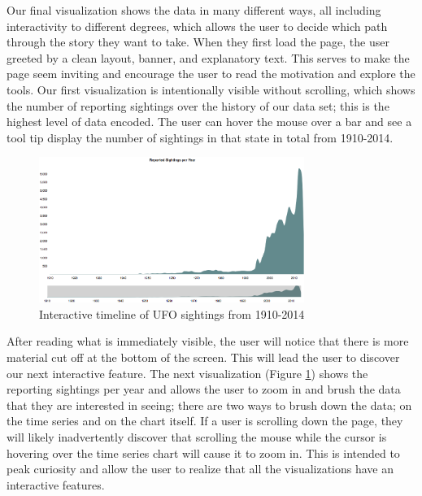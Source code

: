 \documentclass[journal]{vgtc}                %
\begin{document}
%
%
%


Our final visualization shows the data in many different ways, all including interactivity to different degrees, which allows the user to decide which path through the story they want to take. When they first load the page, the user greeted by a clean layout, banner, and explanatory text. This serves to make the page seem inviting and encourage the user to read the motivation and explore the tools. Our first visualization is intentionally visible without scrolling, which shows the number of reporting sightings over the history of our data set; this is the highest level of data encoded. The user can hover the mouse over a bar and see a tool tip display the number of sightings in that state in total from 1910-2014.

\begin{figure}[h]
\centering
\includegraphics[width=3.4in]{timeline.png}
\caption{Interactive timeline of UFO sightings from 1910-2014}
\label{timeline}
\end{figure}


After reading what is immediately visible, the user will notice that there is more material cut off at the bottom of the screen. This will lead the user to discover our next interactive feature. The next visualization (Figure \ref{timeline}) shows the reporting sightings per year and allows the user to zoom in and brush the data that they are interested in seeing; there are two ways to brush down the data; on the time series and on the chart itself. If a user is scrolling down the page, they will likely inadvertently discover that scrolling the mouse while the cursor is hovering over the time series chart will cause it to zoom in. This is intended to peak curiosity and allow the user to realize that all the visualizations have an interactive features.
\end{document}
